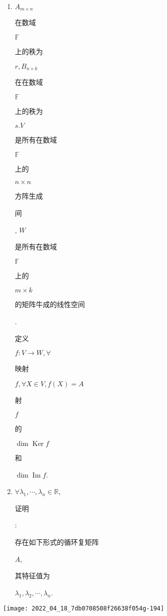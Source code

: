 \documentclass[10pt]{article}
\begin{document}
\begin{enumerate}
  \item $A_{m \times n}$ \begin{CJK}{UTF8}{mj}在数域\end{CJK} $\mathbb{F}$ \begin{CJK}{UTF8}{mj}上的秩为\end{CJK} $r, B_{n \times k}$ \begin{CJK}{UTF8}{mj}在在数域\end{CJK} $\mathbb{F}$ \begin{CJK}{UTF8}{mj}上的秩为\end{CJK} $s . V$ \begin{CJK}{UTF8}{mj}是所有在数域\end{CJK} $\mathbb{F}$ \begin{CJK}{UTF8}{mj}上的\end{CJK} $n \times n$ \begin{CJK}{UTF8}{mj}方阵生成\end{CJK} \begin{CJK}{UTF8}{mj}间\end{CJK}, $W$ \begin{CJK}{UTF8}{mj}是所有在数域\end{CJK} $\mathbb{F}$ \begin{CJK}{UTF8}{mj}上的\end{CJK} $m \times k$ \begin{CJK}{UTF8}{mj}的矩阵牛成的线性空间\end{CJK}. \begin{CJK}{UTF8}{mj}定义\end{CJK} $f: V \rightarrow W, \forall$ \begin{CJK}{UTF8}{mj}映射\end{CJK} $f, \forall X \in V, f(X)=A$ \begin{CJK}{UTF8}{mj}射\end{CJK} $f$ \begin{CJK}{UTF8}{mj}的\end{CJK} $\operatorname{dim} \operatorname{Ker} f$ \begin{CJK}{UTF8}{mj}和\end{CJK} $\operatorname{dim} \operatorname{Im} f$.

  \item $\forall \lambda_{1}, \cdots, \lambda_{n} \in \mathbb{R}$, \begin{CJK}{UTF8}{mj}证明\end{CJK}: \begin{CJK}{UTF8}{mj}存在如下形式的循环复矩阵\end{CJK} $A$, \begin{CJK}{UTF8}{mj}其特征值为\end{CJK} $\lambda_{1}, \lambda_{2}, \cdots, \lambda_{n}$.

\end{enumerate}
\texttt{[image: 2022\_04\_18\_7db0708508f26638f054g-194]}
\end{document}
